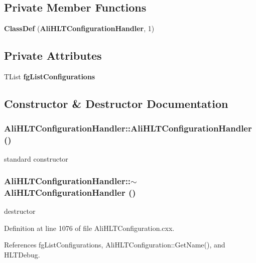 \subsection*{Private Member Functions}
\begin{CompactItemize}
\item 
{\bf Class\-Def} ({\bf Ali\-HLTConfiguration\-Handler}, 1)
\end{CompactItemize}
\subsection*{Private Attributes}
\begin{CompactItemize}
\item 
TList {\bf fg\-List\-Configurations}
\end{CompactItemize}


\subsection{Constructor \& Destructor Documentation}
\subsubsection{\setlength{\rightskip}{0pt plus 5cm}Ali\-HLTConfiguration\-Handler::Ali\-HLTConfiguration\-Handler ()}\label{classAliHLTConfigurationHandler_a0}


standard constructor 
\subsubsection{\setlength{\rightskip}{0pt plus 5cm}Ali\-HLTConfiguration\-Handler::$\sim${\bf Ali\-HLTConfiguration\-Handler} ()\hspace{0.3cm}{\tt  [virtual]}}\label{classAliHLTConfigurationHandler_a1}


destructor 

Definition at line 1076 of file Ali\-HLTConfiguration.cxx.

References fg\-List\-Configurations, Ali\-HLTConfiguration::Get\-Name(), and HLTDebug.

